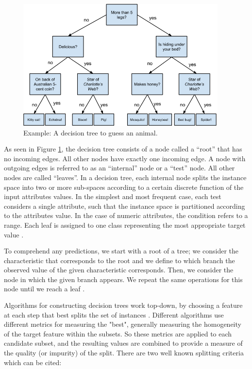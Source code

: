 \begin{figure}[ht]
\centering
\includegraphics[width=400px]{figures/decision_tree_example.png}
\caption{Example: A decision tree to guess an animal. \cite{grus2019data}}
\label{fig:exampleDecisionTreeGuessAnimal}
\end{figure}

As seen in Figure \ref{fig:exampleDecisionTreeGuessAnimal}, the decision tree consists of a node called a “root” that has no incoming edges. All other nodes have exactly one incoming edge. A node
with outgoing edges is referred to as an “internal” node or a “test” node.
All other nodes are called “leaves”. In a decision tree, each internal node splits the instance
space into two or more sub-spaces according to a certain discrete function
of the input attributes values. In the simplest and most frequent case, each
test considers a single attribute, such that the instance space is partitioned
according to the attributes value. In the case of numeric attributes, the
condition refers to a range. Each leaf is assigned to one class representing the most appropriate
target value \cite{rokach2008data}.

To comprehend any predictions, we start with a root of a tree; we consider the characteristic that corresponds to the root and we define to which branch the observed value of the given characteristic corresponds. Then, we consider the node in which the given
branch appears. We repeat the same operations for this node until we reach a leaf \cite{rokach2008data}.

Algorithms for constructing decision trees work top-down, by choosing a feature at each step that best splits the set of instances \cite{rokach2008data}. Different algorithms use different metrics for measuring the "best",  generally measuring the homogeneity of the target feature within the subsets. So these metrics are applied to each candidate subset, and the resulting values are combined to provide a measure of the quality (or impurity) of the split. There are two well known splitting criteria which can be cited:


